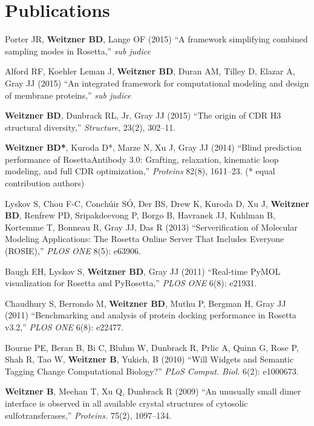 \documentclass[12pt]{article}
\newcommand{\allcapsspacing}[1]{{\addfontfeature{LetterSpace=7.5}#1}}
\begin{document}
\section*{\allcapsspacing{Publications}}
\begin{etaremune}
\item Porter JR, \textbf{Weitzner BD}, Lange OF (2015) ``A framework simplifying combined sampling modes in Rosetta,'' \textit{sub judice}
\item Alford RF, Koehler Leman J, \textbf{Weitzner BD}, Duran AM, Tilley D, Elazar A, Gray JJ (2015) ``An integrated framework for computational modeling and design of membrane proteins,'' \textit{sub judice}
\item \textbf{Weitzner BD}, Dunbrack RL, Jr, Gray JJ (2015) ``The origin of CDR H3 structural diversity,'' \textit{Structure}, 23(2), 302--11.
\item \textbf{Weitzner BD*}, Kuroda D*, Marze N, Xu J, Gray JJ (2014) ``Blind prediction performance of RosettaAntibody 3.0: Grafting, relaxation, kinematic loop modeling, and full CDR optimization,'' \textit{Proteins} 82(8), 1611--23. (* equal contribution authors)
\item Lyskov S, Chou F-C, Conch{\'u}ir S{\'O}, Der BS, Drew K, Kuroda D, Xu J, \textbf{Weitzner BD}, Renfrew PD, Sripakdeevong P, Borgo B, Havranek JJ, Kuhlman B, Kortemme T, Bonneau R, Gray JJ, Das R (2013) ``Serverification of Molecular Modeling Applications: The Rosetta Online Server That Includes Everyone (ROSIE),'' \textit{PLOS ONE} 8(5): e63906.
\item Baugh EH, Lyskov S, \textbf{Weitzner BD}, Gray JJ (2011) ``Real-time PyMOL visualization for Rosetta and PyRosetta,'' \textit{PLOS ONE} 6(8): e21931.
\item Chaudhury S, Berrondo M, \textbf{Weitzner BD}, Muthu P, Bergman H, Gray JJ (2011) ``Benchmarking and analysis of protein docking performance in Rosetta v3.2,'' \textit{PLOS ONE} 6(8): e22477.
\item Bourne PE, Beran B, Bi C, Bluhm W, Dunbrack R, Prlic A, Quinn G, Rose P, Shah R, Tao W, \textbf{Weitzner B}, Yukich, B (2010) ``Will Widgets and Semantic Tagging Change Computational Biology?'' \textit{PLoS Comput. Biol.} 6(2): e1000673.
\item \textbf{Weitzner B}, Meehan T, Xu Q, Dunbrack R (2009) ``An unusually small dimer interface is observed in all available crystal structures of cytosolic sulfotransferases,'' \textit{Proteins.} 75(2), 1097--134.
\end{etaremune}
\end{document}

